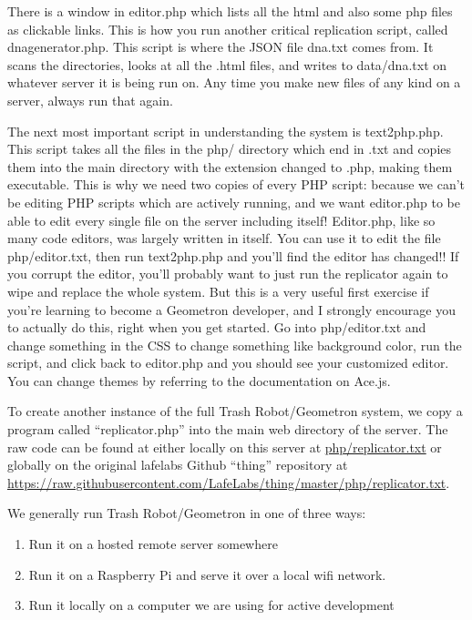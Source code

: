 There is a window in editor.php which lists all the html and also some php files as clickable links.  This is how you run another critical replication script, called dnagenerator.php.  This script is where the JSON file dna.txt comes from.  It scans the directories, looks at all the .html files, and writes to data/dna.txt on whatever server it is being run on.  Any time you make new files of any kind on a server, always run that again.  

The next most important script in understanding the system is text2php.php.  This script takes all the files in the php/ directory which end in .txt and copies them into the main directory with the extension changed to .php, making them executable.  This is why we need two copies of every PHP script: because we can't be editing PHP scripts which are actively running, and we want editor.php to be able to edit every single file on the server including itself! Editor.php, like so many code editors, was largely written in itself.  You can use it to edit the file php/editor.txt, then run text2php.php and you'll find the editor has changed!! If you corrupt the editor, you'll probably want to just run the replicator again to wipe and replace the whole system.  But this is a very useful first exercise if you're learning to become a Geometron developer, and I strongly encourage you to actually do this, right when you get started.  Go into php/editor.txt and change something in the CSS to change something like background color, run the script, and click back to editor.php and you should see your customized editor. You can change themes by referring to the documentation on Ace.js.

To create another instance of the full Trash Robot/Geometron system, we
copy a program called ``replicator.php'' into the main web directory of
the server. The raw code can be found at either locally on this server
at \url{php/replicator.txt} or globally on the original lafelabs Github
``thing'' repository at
\url{https://raw.githubusercontent.com/LafeLabs/thing/master/php/replicator.txt}.

We generally run Trash Robot/Geometron in one of three ways:

\begin{enumerate}
\def\labelenumi{\arabic{enumi}.}
\tightlist
\item
  Run it on a hosted remote server somewhere
\item
  Run it on a Raspberry Pi and serve it over a local wifi network.
\item
  Run it locally on a computer we are using for active development
\end{enumerate}


